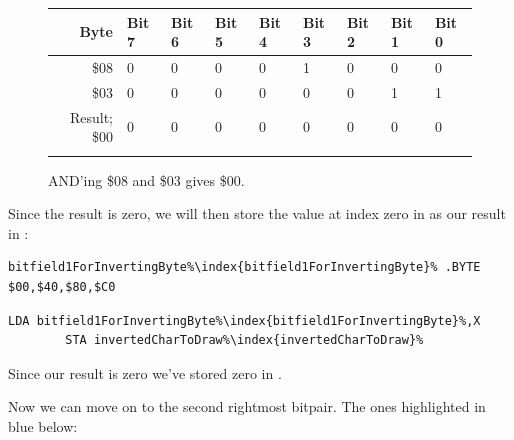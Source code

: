 \begin{figure}[H]
  {
    \setlength{\tabcolsep}{3.0pt}
    \setlength\cmidrulewidth{\heavyrulewidth} %
    \begin{adjustbox}{width=10cm,center}

      \begin{tabular}{rllllllll}
        \toprule
        Byte & Bit 7 & Bit 6 & Bit 5 & Bit 4 & Bit 3 & Bit 2 & Bit 1 & Bit 0        \\
        \midrule
        \$08 & 0 & 0 & 0 & 0 & 1 & 0 & 0 & 0 \\
        \$03 & 0 & 0 & 0 & 0 & 0 & 0 & 1 & 1 \\
        \midrule
        Result; \$00 & 0 & 0 & 0 & 0 & 0 & 0 & 0 & 0 \\
        \addlinespace
        \bottomrule
      \end{tabular}

    \end{adjustbox}

  }\caption*{AND'ing \$08 and \$03 gives \$00.}
\end{figure}

Since the result is zero, we will then store the value at index zero in 
as our result in :

\begin{lstlisting}[escapechar=\%]
bitfield1ForInvertingByte%\index{bitfield1ForInvertingByte}% .BYTE $00,$40,$80,$C0
\end{lstlisting}
\begin{lstlisting}[escapechar=\%]
        LDA bitfield1ForInvertingByte%\index{bitfield1ForInvertingByte}%,X
        STA invertedCharToDraw%\index{invertedCharToDraw}%
\end{lstlisting}

Since our result is zero we've stored zero in .

Now we can move on to the second rightmost bitpair. The ones highlighted in blue below:

